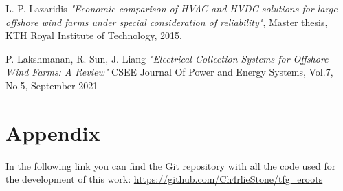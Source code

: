 \documentclass[a4paper,11pt, titlepage, twoside]{article}
\begin{document}
\begin{thebibliography}{99}
{L. P. Lazaridis}
\textit{"Economic comparison of HVAC and HVDC solutions for large offshore wind farms under special consideration of reliability"}, Master thesis, KTH Royal Institute of Technology, 2015.

{P. Lakshmanan, R. Sun, J. Liang}
\textit{"Electrical Collection Systems for Offshore Wind
Farms: A Review"} CSEE Journal Of Power and Energy Systems, Vol.7, No.5, September 2021














\end{thebibliography}


\section*{Appendix}\label{Appendix}

In the following link you can find the Git repository with all the code used for the development of this work:
\url{https://github.com/Ch4rlieStone/tfg_eroots}
 
\end{document}
